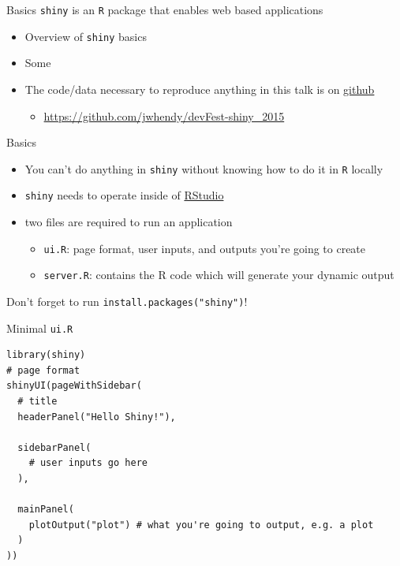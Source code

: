 \documentclass[sans,aspectratio=169,presentation,bigger,fleqn]{beamer}
\begin{document}
\begin{frame}[fragile,label=sec-4]{Basics}
 \texttt{shiny} is an \texttt{R} package that enables web based applications
\begin{itemize}
\item Overview of \texttt{shiny} basics
\item Some
\item The code/data necessary to reproduce anything in this talk is on \href{https://github.com/jwhendy/devFest-shiny_2015}{github}
\begin{itemize}
\item \url{https://github.com/jwhendy/devFest-shiny_2015}
\end{itemize}
\end{itemize}
\end{frame}

\begin{frame}[fragile,label=sec-5]{Basics}
 \begin{itemize}
\item You can't do anything in \texttt{shiny} without knowing how to do it in \texttt{R} locally
\item \texttt{shiny} needs to operate inside of \href{http://www.rstudio.com/}{RStudio}
\item\relax [At least] two files are required to run an application
\begin{itemize}
\item \texttt{ui.R}: page format, user inputs, and outputs you're going to create
\item \texttt{server.R}: contains the R code which will generate your dynamic output
\end{itemize}
\end{itemize}

\vspace{0.5cm}

Don't forget to run \texttt{install.packages("shiny")}!
\end{frame}

\begin{frame}[fragile,label=sec-6]{Minimal \texttt{ui.R}}
 \scriptsize
\begin{verbatim}
library(shiny)
# page format
shinyUI(pageWithSidebar(
  # title
  headerPanel("Hello Shiny!"),

  sidebarPanel(
    # user inputs go here
  ),

  mainPanel(
    plotOutput("plot") # what you're going to output, e.g. a plot
  )
))
\end{verbatim}
\scriptsize
\end{frame}
\end{document}
